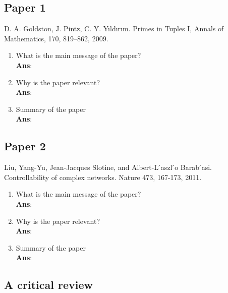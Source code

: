 \documentclass[11pt]{article}
\begin{document}
\subsection*{Paper 1}
D. A. Goldston, J. Pintz, C. Y. Yıldırım. Primes in Tuples I, Annals of Mathematics, 170, 819–862, 2009.
\begin{enumerate}[label=(\alph*)]
	\item What is the main message of the paper? \\ \textbf{Ans}:
	\item Why is the paper relevant? \\ \textbf{Ans}:
	\item Summary of the paper \\ \textbf{Ans}:
\end{enumerate}

\subsection*{Paper 2}
Liu, Yang-Yu, Jean-Jacques Slotine, and Albert-L ́aszl ́o Barab ́asi. Controllability of complex networks. Nature 473, 167-173, 2011.
\begin{enumerate}[label=(\alph*)]
	\item What is the main message of the paper? \\ \textbf{Ans}:
	\item Why is the paper relevant? \\ \textbf{Ans}:
	\item Summary of the paper \\ \textbf{Ans}:
\end{enumerate}

\subsection*{A critical review}
\end{document}

